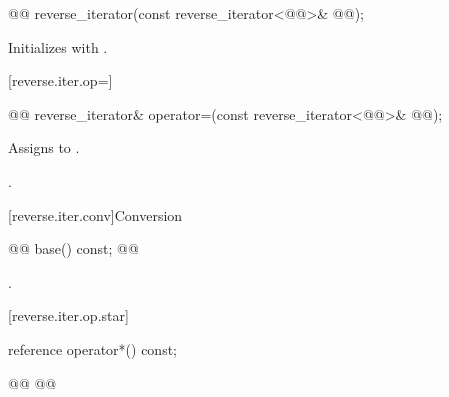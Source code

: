 %

\begin{itemdecl}
@@
reverse_iterator(const reverse_iterator<@@>& @@);
\end{itemdecl}

\begin{itemdescr}
\pnum
\effects
Initializes
with
.
\end{itemdescr}

[reverse.iter.op=]{}

%
\begin{itemdecl}
@@
reverse_iterator&
  operator=(const reverse_iterator<@@>& @@);
\end{itemdecl}

\begin{itemdescr}
\pnum
\effects
Assigns  to .

\pnum
\returns
{}.
\end{itemdescr}

[reverse.iter.conv]{Conversion}

%
%
\begin{itemdecl}
@@ base() const;          @@
\end{itemdecl}

\begin{itemdescr}
\pnum
\returns
{}.
\end{itemdescr}

[reverse.iter.op.star]{}

%
\begin{itemdecl}
reference operator*() const;
\end{itemdecl}

\begin{itemdescr}
\pnum
\effects {}
\begin{codeblock}
@@
@@
\end{codeblock}

\end{itemdescr}

